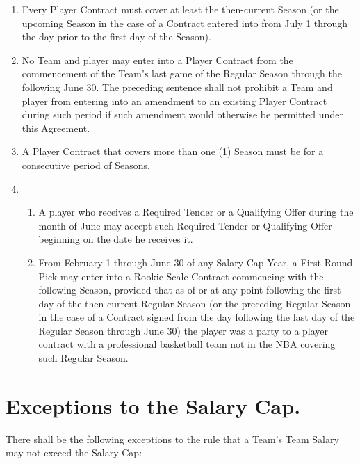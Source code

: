 \documentclass[
]{book}
\providecommand{\tightlist}{%
  \setlength{\itemsep}{0pt}\setlength{\parskip}{0pt}}
\begin{document}
\begin{enumerate}
  \begin{enumerate}
  \def\labelenumii{(\arabic{enumii})}
  \item
    Every Player Contract must cover at least the then-current Season (or the upcoming Season in the case of a Contract entered into from July 1 through the day prior to the first day of the Season).
  \item
    No Team and player may enter into a Player Contract from the commencement of the Team's last game of the Regular Season through the following June 30. The preceding sentence shall not prohibit a Team and player from entering into an amendment to an existing Player Contract during such period if such amendment would otherwise be permitted under this Agreement.
  \item
    A Player Contract that covers more than one (1) Season must be for a consecutive period of Seasons.
  \item
    \begin{enumerate}
    \def\labelenumiii{(\roman{enumiii})}
    \tightlist
    \item
      A player who receives a Required Tender or a Qualifying Offer during the month of June may accept such Required Tender or Qualifying Offer beginning on the date he receives it.
    \item
      From February 1 through June 30 of any Salary Cap Year, a First Round Pick may enter into a Rookie Scale Contract commencing with the following Season, provided that as of or at any point following the first day of the then-current Regular Season (or the preceding Regular Season in the case of a Contract signed from the day following the last day of the Regular Season through June 30) the player was a party to a player contract with a professional basketball team not in the NBA covering such Regular Season.
    \end{enumerate}
  \end{enumerate}
\end{enumerate}

\hypertarget{exceptions-to-the-salary-cap.}{%
\section{Exceptions to the Salary Cap.}\label{exceptions-to-the-salary-cap.}}

There shall be the following exceptions to the rule that a Team's Team Salary may not exceed the Salary Cap:
\end{document}
